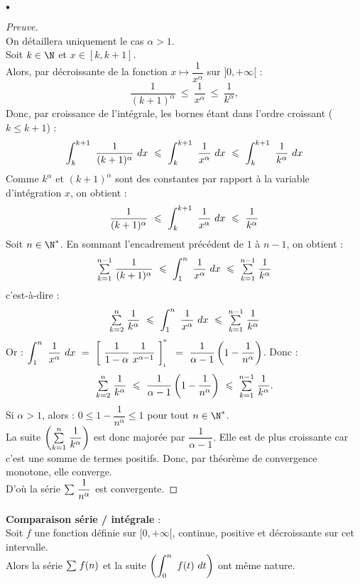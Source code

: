 \documentclass[11pt]{article}%
\begin{document}
\begin{noliste}{$\scriptstyle \bullet$}
  \begin{proof}[Preuve]~\\
    On détaillera uniquement le cas $\alpha>1$.\\
    Soit $k \in \N$ et $x \in [k, k+1]$.\\ 
    Alors, par décroissante de la fonction 
    $x \mapsto \dfrac{1}{x^\alpha}$ sur $]0,+\infty[$ :
    \[
      \dfrac{1}{(k+1)^\alpha} \ \leq \ \dfrac{1}{x^\alpha} 
      \ \leq \ \dfrac{1}{k^\alpha},
    \]
    Donc, par croissance de l'intégrale, les bornes étant 
    dans l'ordre croissant ($k \leq k+1$) :
    \[
      \displaystyle \int_{k}^{k+1}\  \dfrac{1}{(k+1)^\alpha} \ dx 
      \ \leqslant \ \displaystyle \int_{k}^{k+1}\  \dfrac{1}{x^\alpha} \ dx
      \ \leqslant \ \displaystyle \int_{k}^{k+1}\  \dfrac{1}{k^\alpha} \ dx
    \]
    Comme $k^\alpha$ et $(k+1)^\alpha$ sont des constantes par 
    rapport à la variable d'intégration $x$, on obtient :
    \[
      \dfrac{1}{(k+1)^\alpha} \ \leqslant \ \displaystyle \int_{k}^{k+1}\  
      \dfrac{1}{x^\alpha} \ dx \ \leqslant \ \dfrac{1}{k^\alpha}
    \]
    Soit $n \in \N^*$. En sommant l'encadrement précédent de $1$ à 
    $n-1$, on obtient :
    \[
      \Sum{k=1}{n-1} \dfrac{1}{(k+1)^\alpha} \ \leq \ 
      \dint{1}{n} \dfrac{1}{x^\alpha} \dx \ \leq \ \Sum{k=1}{n-1} 
      \dfrac{1}{k^\alpha}
    \]
    c'est-à-dire :
    \[
    {\textstyle\sum\limits_{k=2}^{n}}\hspace{.1cm} \dfrac{1}{k^\alpha}
    \ \leqslant \ \displaystyle \int_{1}^{n}\  \dfrac{1}{x^\alpha} \ dx 
    \ \leqslant \ {\textstyle\sum\limits_{k=1}^{n-1}}\hspace{.1cm} \dfrac{1}{k^\alpha}
    \]
    Or : $\dint{1}{n} \dfrac{1}{x^\alpha} \dx 
    \ = \ \Prim{ \dfrac{1}{1-\alpha} \, \dfrac{1}{x^{\alpha-1}}}{1}{n} 
    \ = \ \dfrac{1}{\alpha-1} \left( 1- \dfrac{1}{n^\alpha} \right)$. 
    Donc :
    \[
      {\textstyle\sum\limits_{k=2}^{n}}\hspace{.1cm} \dfrac{1}{k^\alpha}
      \ \leqslant \ \dfrac{1}{\alpha-1} \left( 1- \dfrac{1}{n^\alpha} 
      \right)
      \ \leqslant \ {\textstyle\sum\limits_{k=1}^{n-1}}\hspace{.1cm} \dfrac{1}{k^\alpha}.
    \]
    Si $\alpha >1$, alors : $0 \leq 1 - \dfrac{1}{n^\alpha} 
      \leq 1$ pour tout $n \in \N^*$.\\[.2cm]
      La suite $\left( {\textstyle\sum\limits_{k=1}^{n}}\hspace{.1cm} \dfrac{1}{k^\alpha} \right)$ est 
      donc majorée par $\dfrac{1}{\alpha -1}$. Elle est de plus 
      croissante car c'est une somme de termes positifs. Donc, par 
      théorème de convergence monotone, elle converge.\\ 
      D'où la série ${\textstyle\sum\limits_{}^{}}\hspace{.1cm} \dfrac{1}{n^\alpha}$ est convergente.
  \end{proof}
  
  
  \newpage
  
  
  \item {\bf Comparaison série / intégrale} :\\ 
  Soit $f$ une fonction définie sur $[0,+ \infty[$, continue, 
  positive et décroissante sur cet intervalle.\\
  Alors la série ${\textstyle\sum\limits_{}^{}}\hspace{.1cm} f(n)$ et la suite $\left(
  \displaystyle \int_{0}^{n}\  f(t) \ dt\right)$ ont même nature.


\end{noliste}
\end{document}
